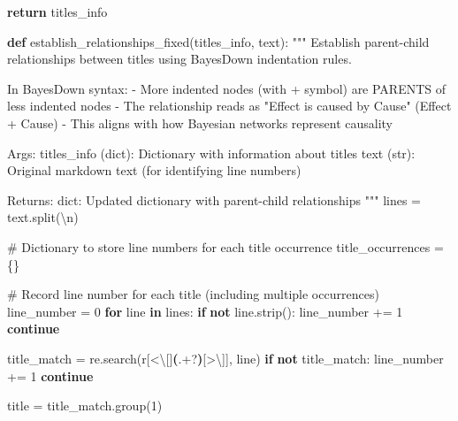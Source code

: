 \documentclass[
  11pt,
  letterpaper,
]{book}
\newenvironment{Shaded}{\begin{snugshade}}{\end{snugshade}}
\newcommand{\CharTok}[1]{\textcolor[rgb]{0.13,0.47,0.30}{#1}}
\newcommand{\CommentTok}[1]{\textcolor[rgb]{0.37,0.37,0.37}{#1}}
\newcommand{\ControlFlowTok}[1]{\textcolor[rgb]{0.00,0.23,0.31}{\textbf{#1}}}
\newcommand{\DecValTok}[1]{\textcolor[rgb]{0.68,0.00,0.00}{#1}}
\newcommand{\KeywordTok}[1]{\textcolor[rgb]{0.00,0.23,0.31}{\textbf{#1}}}
\newcommand{\NormalTok}[1]{\textcolor[rgb]{0.00,0.23,0.31}{#1}}
\newcommand{\OperatorTok}[1]{\textcolor[rgb]{0.37,0.37,0.37}{#1}}
\newcommand{\PreprocessorTok}[1]{\textcolor[rgb]{0.68,0.00,0.00}{#1}}
\newcommand{\StringTok}[1]{\textcolor[rgb]{0.13,0.47,0.30}{#1}}
\newcommand{\VerbatimStringTok}[1]{\textcolor[rgb]{0.13,0.47,0.30}{#1}}
\begin{document}
\begin{Shaded}
\begin{Highlighting}[]
    \ControlFlowTok{return}\NormalTok{ titles\_info}

\KeywordTok{def}\NormalTok{ establish\_relationships\_fixed(titles\_info, text):}
    \CommentTok{"""}
\CommentTok{    Establish parent{-}child relationships between titles using BayesDown}
\CommentTok{    indentation rules.}

\CommentTok{    In BayesDown syntax:}
\CommentTok{    {-} More indented nodes (with + symbol) are PARENTS of less indented nodes}
\CommentTok{    {-} The relationship reads as "Effect is caused by Cause" (Effect + Cause)}
\CommentTok{    {-} This aligns with how Bayesian networks represent causality}

\CommentTok{    Args:}
\CommentTok{        titles\_info (dict): Dictionary with information about titles}
\CommentTok{        text (str): Original markdown text (for identifying line numbers)}

\CommentTok{    Returns:}
\CommentTok{        dict: Updated dictionary with parent{-}child relationships}
\CommentTok{    """}
\NormalTok{    lines }\OperatorTok{=}\NormalTok{ text.split(}\StringTok{\textquotesingle{}}\CharTok{\textbackslash{}n}\StringTok{\textquotesingle{}}\NormalTok{)}

    \CommentTok{\# Dictionary to store line numbers for each title occurrence}
\NormalTok{    title\_occurrences }\OperatorTok{=}\NormalTok{ \{\}}

    \CommentTok{\# Record line number for each title (including multiple occurrences)}
\NormalTok{    line\_number }\OperatorTok{=} \DecValTok{0}
    \ControlFlowTok{for}\NormalTok{ line }\KeywordTok{in}\NormalTok{ lines:}
        \ControlFlowTok{if} \KeywordTok{not}\NormalTok{ line.strip():}
\NormalTok{            line\_number }\OperatorTok{+=} \DecValTok{1}
            \ControlFlowTok{continue}

\NormalTok{        title\_match }\OperatorTok{=}\NormalTok{ re.search(}\VerbatimStringTok{r\textquotesingle{}}\PreprocessorTok{[\textless{}}\CharTok{\textbackslash{}[}\PreprocessorTok{]}\KeywordTok{(}\DecValTok{.}\OperatorTok{+?}\KeywordTok{)}\PreprocessorTok{[\textgreater{}}\CharTok{\textbackslash{}]}\PreprocessorTok{]}\VerbatimStringTok{\textquotesingle{}}\NormalTok{, line)}
        \ControlFlowTok{if} \KeywordTok{not}\NormalTok{ title\_match:}
\NormalTok{            line\_number }\OperatorTok{+=} \DecValTok{1}
            \ControlFlowTok{continue}

\NormalTok{        title }\OperatorTok{=}\NormalTok{ title\_match.group(}\DecValTok{1}\NormalTok{)}


\end{Highlighting}
\end{Shaded}
\end{document}
